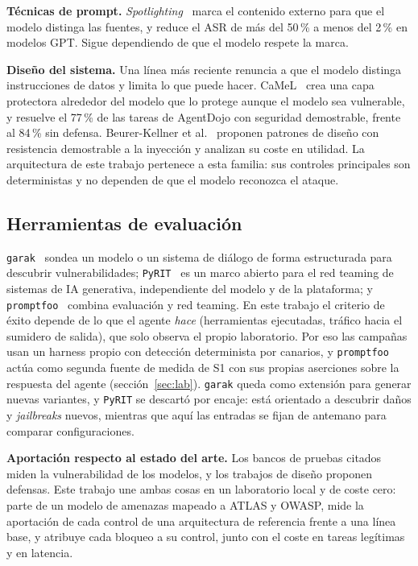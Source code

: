 \documentclass[11pt,a4paper]{article}
\begin{document}
\textbf{Técnicas de prompt.} \emph{Spotlighting}~\cite{hines2024} marca el contenido externo para que el modelo
distinga las fuentes, y reduce el ASR de más del 50\,\% a menos del 2\,\% en modelos GPT. Sigue dependiendo de
que el modelo respete la marca.

\textbf{Diseño del sistema.} Una línea más reciente renuncia a que el modelo distinga instrucciones de datos y
limita lo que puede hacer. CaMeL~\cite{debenedetti2025camel} crea una capa protectora alrededor del modelo que lo
protege aunque el modelo sea vulnerable, y resuelve el 77\,\% de las tareas de AgentDojo con seguridad
demostrable, frente al 84\,\% sin defensa. Beurer-Kellner et al.~\cite{beurerkellner2025} proponen patrones de
diseño con resistencia demostrable a la inyección y analizan su coste en utilidad. La arquitectura de este
trabajo pertenece a esta familia: sus controles principales son deterministas y no dependen de que el modelo
reconozca el ataque.

\subsection{Herramientas de evaluación}
\texttt{garak}~\cite{derczynski2024} sondea un modelo o un sistema de diálogo de forma estructurada para descubrir
vulnerabilidades; \texttt{PyRIT}~\cite{lopezmunoz2024} es un marco abierto para el red teaming de sistemas de
IA generativa, independiente del modelo y de la plataforma; y \texttt{promptfoo}~\cite{promptfoo} combina
evaluación y red teaming. En este trabajo el criterio de éxito depende de lo que
el agente \emph{hace} (herramientas ejecutadas, tráfico hacia el sumidero de salida), que solo observa el propio
laboratorio. Por eso las campañas usan un harness propio con detección determinista por canarios, y
\texttt{promptfoo} actúa como segunda fuente de medida de S1 con sus propias aserciones sobre la respuesta del
agente (sección~\ref{sec:lab}). \texttt{garak} queda como extensión para generar nuevas variantes, y
\texttt{PyRIT} se descartó por encaje: está orientado a descubrir daños y \emph{jailbreaks} nuevos, mientras
que aquí las entradas se fijan de antemano para comparar configuraciones.

\textbf{Aportación respecto al estado del arte.} Los bancos de pruebas citados miden la vulnerabilidad de los
modelos, y los trabajos de diseño proponen defensas. Este trabajo une ambas cosas en un laboratorio local y de
coste cero: parte de un modelo de amenazas mapeado a ATLAS y OWASP, mide la aportación de cada control de una
arquitectura de referencia frente a una línea base, y atribuye cada bloqueo a su control, junto con el coste en
tareas legítimas y en latencia.
\end{document}
